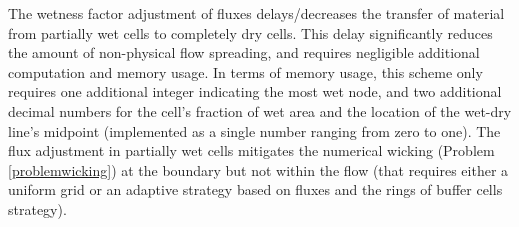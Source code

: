 \documentclass[letterpaper,10pt]{article}
\begin{document}
The wetness factor adjustment of fluxes delays/decreases the transfer 
of material from partially wet cells to completely dry cells.  This 
delay significantly reduces the amount of non-physical flow spreading, 
and requires negligible additional computation and memory usage.  In 
terms of memory usage, this scheme only requires one additional
integer indicating the most wet node, and two additional decimal 
numbers for the cell's fraction of wet area and the location of the 
wet-dry line's midpoint (implemented as a single number ranging from 
zero to one).  The flux adjustment in partially wet cells mitigates
the numerical wicking (Problem \ref{problemwicking}) at the boundary but not within the flow (that
requires either a uniform grid or an adaptive strategy based on
fluxes and the rings of buffer cells strategy).
% 
% 
% 
\end{document}
